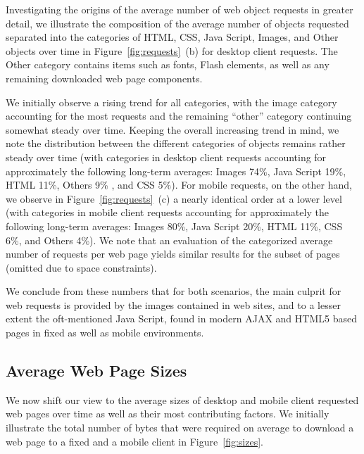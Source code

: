 Investigating the origins of the average number of web object requests in greater detail, we illustrate the composition of the average number of objects requested separated into the categories of HTML, CSS, Java Script, Images, and Other objects over time in Figure~\ref{fig:requests}~(b) for desktop client requests.
The Other category contains items such as fonts, Flash elements, as well as any remaining downloaded web page components.

We initially observe a rising trend for all categories, with the image category accounting for the most requests and the remaining ``other'' category continuing somewhat steady over time.
Keeping the overall increasing trend in mind, we note the distribution between the different categories of objects remains rather steady over time (with categories in desktop client requests accounting for approximately the following long-term averages: Images 74\%, Java Script 19\%, HTML 11\%, Others 9\% , and CSS 5\%).
For mobile requests, on the other hand, we observe in Figure~\ref{fig:requests}~(c) a nearly identical order at a lower level (with categories in mobile client requests accounting for approximately the following long-term averages: Images 80\%, Java Script 20\%, HTML 11\%, CSS 6\%, and Others 4\%).
We note that an evaluation of the categorized average number of requests per web page yields similar results for the subset of pages (omitted due to space constraints).

We conclude from these numbers that for both scenarios, the main culprit for web requests is provided by the images contained in web sites, and to a lesser extent the oft-mentioned Java Script, found in modern AJAX and HTML5 based pages in fixed as well as mobile environments.

\subsection*{Average Web Page Sizes}
\label{ss:bytes}
We now shift our view to the average sizes of desktop and mobile client requested web pages over time as well as their most contributing factors.
We initially illustrate the total number of bytes that were required on average to download a web page to a fixed and a mobile client in Figure~\ref{fig:sizes}.
\begin{figure*}
	\centering
	\qquad
	\\
	\qquad
	\qquad
	\caption{Average total number of bytes constituting a web page in desktop and mobile versions and decomposition into  HTML, CSS, Java Script, Images, and Other object categories.\label{fig:sizes}}
\end{figure*}

